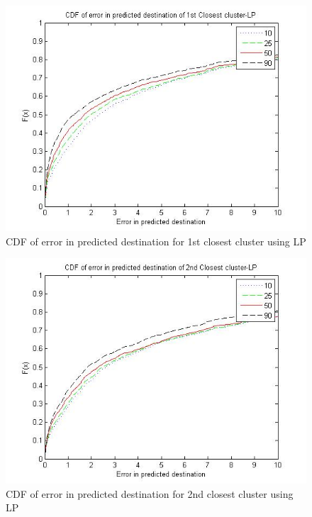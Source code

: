 \begin{figure}
\centering   
\includegraphics[scale=0.4]{figs/lp_top.jpg}
\caption{CDF of error in predicted destination for 1st closest cluster using LP}
\label{fig:lp_top}  
\end{figure}

\begin{figure}
\centering   
\includegraphics[scale=0.4]{figs/lp_top2.jpg}
\caption{CDF of error in predicted destination for 2nd closest cluster using LP}
\label{fig:lp_top2}  
\end{figure}



